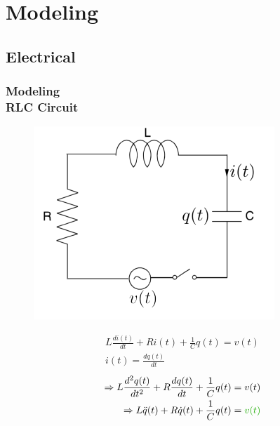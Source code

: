 \documentclass[hyperref={pdfpagelabels=true}]{beamer}
\begin{document}
\section{Modeling}

\subsection{Electrical}
\begin{frame}
\frametitle{Modeling\\ {\large RLC Circuit}} 
\begin{figure}[!t]
\centering
\includegraphics[scale = 0.35]{figs/Selection_020.png}
\end{figure}
\begin{align}
L \frac{di(t)}{dt}+Ri(t)+\frac{1}{C}q(t)=v(t) \\
 i(t)=\frac{dq(t)}{dt}
\end{align} 
\begin{eqnarray*}
\Rightarrow L\frac{d^2q(t)}{dt^2}+R\frac{dq(t)}{dt}+\frac{1}{C}q(t)=v(t) \\
\Rightarrow L\ddot{q}(t)+R\dot{q}(t)+\frac{1}{C}q(t)=\textcolor{mygreen}{v(t)}
\end{eqnarray*}
\end{frame}
\end{document}
